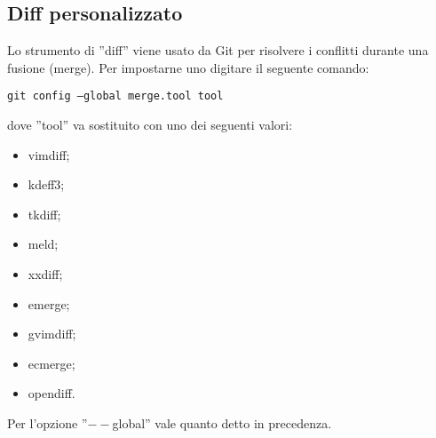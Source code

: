 \subsection{Diff personalizzato}
Lo strumento di ''diff'' viene usato da Git per risolvere i conflitti durante una fusione (merge). Per impostarne uno digitare il seguente comando:

\begin{center}
\texttt{git config --global merge.tool tool}
\end{center}

dove ''tool'' va sostituito con uno dei seguenti valori:

\begin{itemize}
\item vimdiff;
\item kdeff3;
\item tkdiff;
\item meld;
\item xxdiff;
\item emerge;
\item gvimdiff;
\item ecmerge;
\item opendiff.
\end{itemize}

Per l'opzione ''$--$global'' vale quanto detto in precedenza.